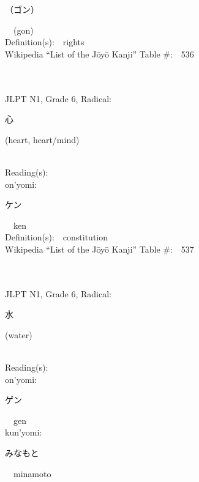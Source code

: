 \begin{multicols}{2}
{\hspace*{2em}}{\begin{CJK}{UTF8}{min} （ゴン） \end{CJK}}\ \ (gon)\ \ \\
Definition(s):\ \ rights \\
Wikipedia ``List of the J\=oy\=o Kanji'' Table \#:\ \ 536 \\
\ \ \\
{\fontsize{34pt}{40pt}  }\ \ \\  %
{JLPT N1, Grade 6, Radical:\ \ {\begin{CJK}{UTF8}{min} 心 \end{CJK}} (heart, heart/mind) } \\
Reading(s):\ \ \\
{\hspace*{1em}}on'yomi:\ \ \\
{\hspace*{2em}}{\begin{CJK}{UTF8}{min} ケン \end{CJK}}\ \ ken\ \ \\
Definition(s):\ \ constitution \\
Wikipedia ``List of the J\=oy\=o Kanji'' Table \#:\ \ 537 \\
\ \ \\
{\fontsize{34pt}{40pt}  }\ \ \\  %
{JLPT N1, Grade 6, Radical:\ \ {\begin{CJK}{UTF8}{min} 水 \end{CJK}} (water) } \\
Reading(s):\ \ \\
{\hspace*{1em}}on'yomi:\ \ \\
{\hspace*{2em}}{\begin{CJK}{UTF8}{min} ゲン \end{CJK}}\ \ gen\ \ \\
{\hspace*{1em}}kun'yomi:\ \ \\
{\hspace*{2em}}{\begin{CJK}{UTF8}{min} みなもと \end{CJK}}\ \ minamoto\ \ \\

\end{multicols}
